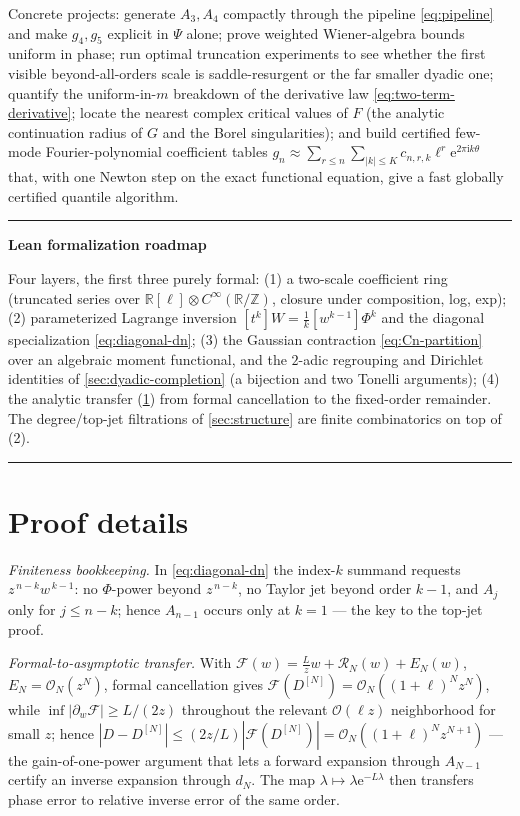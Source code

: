 \documentclass[11pt,oneside]{article}
\numberwithin{equation}{section}
\theoremstyle{definition}
\theoremstyle{remark}
\newcommand{\R}{\mathbb R}
\newcommand{\Z}{\mathbb Z}
\newcommand{\e}{\mathrm e}
\newcommand{\ii}{\mathrm i}
\newcommand{\bigO}{\mathcal O}
\newcommand{\abs}[1]{\left\lvert #1\right\rvert}
\newenvironment{statusbox}[1]{%
  \par\smallskip\noindent\begin{center}\begin{minipage}{0.94\textwidth}%
  \hrule\vspace{0.5em}\noindent\textbf{#1}\par\smallskip
}{%
  \vspace{0.5em}\hrule\end{minipage}\end{center}\smallskip
}
\begin{document}
Concrete projects: generate $A_3,A_4$ compactly through the pipeline
\eqref{eq:pipeline} and make $g_4,g_5$ explicit in $\Psi$ alone;
prove weighted Wiener-algebra bounds uniform in phase; run optimal
truncation experiments to see whether the first visible
beyond-all-orders scale is saddle-resurgent or the far smaller
dyadic one; quantify the uniform-in-$m$ breakdown of the derivative
law \eqref{eq:two-term-derivative}; locate the nearest complex
critical values of $F$ (the analytic continuation radius of $G$ and
the Borel singularities); and build certified few-mode
Fourier-polynomial coefficient tables
$g_n\approx\sum_{r\le n}\sum_{\abs k\le K}c_{n,r,k}\ell^{r}
\e^{2\pi\ii k\theta}$ that, with one Newton step on the exact
functional equation, give a fast globally certified quantile
algorithm.

\begin{statusbox}{Lean formalization roadmap}
Four layers, the first three purely formal:
(1) a two-scale coefficient ring (truncated series over
$\R[\ell]\otimes C^\infty(\R/\Z)$, closure under composition, log,
exp); (2) parameterized Lagrange inversion
$[t^{k}]W=\tfrac1k[w^{k-1}]\Phi^{k}$ and the diagonal specialization
\eqref{eq:diagonal-dn}; (3) the Gaussian contraction
\eqref{eq:Cn-partition} over an algebraic moment functional, and the
$2$-adic regrouping and Dirichlet identities of
\cref{sec:dyadic-completion} (a bijection and two Tonelli
arguments); (4) the analytic transfer
(\cref{app:proof-details}) from formal cancellation to the
fixed-order remainder.  The degree/top-jet filtrations of
\cref{sec:structure} are finite combinatorics on top of (2).
\end{statusbox}

\appendix

\section{Proof details}
\label{app:proof-details}

\emph{Finiteness bookkeeping.}  In \eqref{eq:diagonal-dn} the index-$k$
summand requests $z^{\,n-k}w^{\,k-1}$: no $\Phi$-power beyond
$z^{\,n-k}$, no Taylor jet beyond order $k-1$, and $A_j$ only for
$j\le n-k$; hence $A_{n-1}$ occurs only at $k=1$ --- the key to the
top-jet proof.

\emph{Formal-to-asymptotic transfer.}  With
$\mathscr F(w)=\tfrac Lzw+\mathcal R_N(w)+E_N(w)$,
$E_N=\bigO_N(z^{N})$, formal cancellation gives
$\mathscr F(D^{[N]})=\bigO_N((1+\ell)^{N}z^{N})$, while
$\inf\abs{\partial_w\mathscr F}\ge L/(2z)$ throughout the relevant
$\bigO(\ell z)$ neighborhood for small $z$; hence
$\abs{D-D^{[N]}}\le(2z/L)\abs{\mathscr F(D^{[N]})}
=\bigO_N((1+\ell)^{N}z^{N+1})$ --- the gain-of-one-power argument
that lets a forward expansion through $A_{N-1}$ certify an inverse
expansion through $d_N$.  The map
$\lambda\mapsto\lambda\e^{-L\lambda}$ then transfers phase error to
relative inverse error of the same order.
\end{document}
